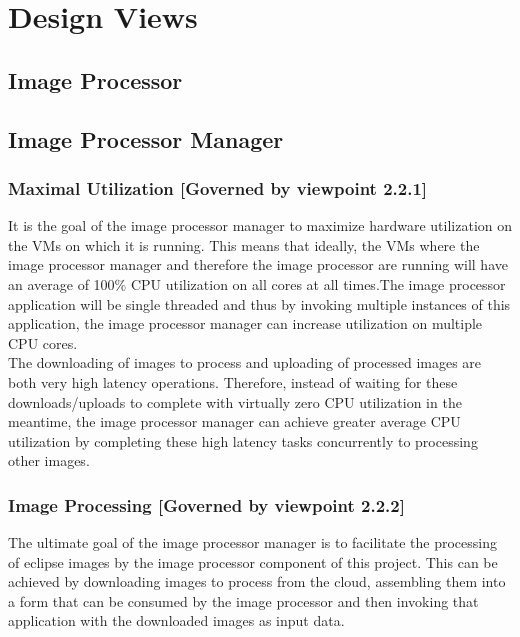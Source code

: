 \documentclass[10pt, onecolumn, draftclsnofoot, letterpaper, compsoc]{IEEEtran}
\begin{document}
\section{Design Views}

\subsection{Image Processor}

\subsection{Image Processor Manager}

    \subsubsection{Maximal Utilization [Governed by viewpoint 2.2.1]}
    It is the goal of the image processor manager to maximize hardware utilization on the VMs on which it is 
    running. This means that ideally, the VMs where the image processor manager and therefore the image 
    processor are running will have an average of 100\% CPU utilization on all cores at all times.The image 
    processor application will be single threaded and thus by invoking multiple instances of this application, 
    the image processor manager can increase utilization on multiple CPU cores. \\

    The downloading of images to process and uploading of processed images are both very high latency 
    operations. Therefore, instead of waiting for these downloads/uploads to complete with virtually zero CPU 
    utilization in the meantime, the image processor manager can achieve greater average CPU utilization by 
    completing these high latency tasks concurrently to processing other images. \\

    \subsubsection{Image Processing [Governed by viewpoint 2.2.2]}
    The ultimate goal of the image processor manager is to facilitate the processing of eclipse images by the 
    image processor component of this project. This can be achieved by downloading images to process from the 
    cloud, assembling them into a form that can be consumed by the image processor and then invoking that 
    application with the downloaded images as input data. \\
\end{document}
